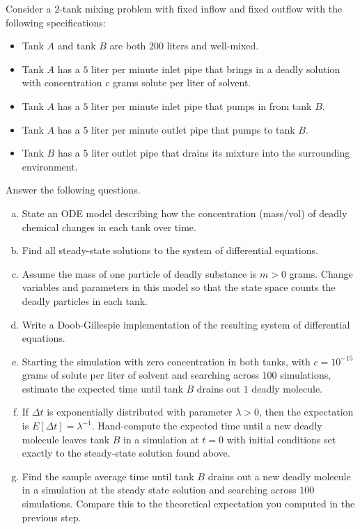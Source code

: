 \begin{exercises}

\item \label{ex:hw_two_tank}
Consider a $2$-tank mixing problem with fixed inflow and fixed outflow with the following specifications:
\begin{itemize}
\item Tank $A$ and tank $B$ are both $200$ liters and well-mixed.
\item Tank $A$ has a $5$ liter per minute inlet pipe that brings in a deadly solution with concentration $c$ grams solute per liter of solvent.
\item Tank $A$ has a $5$ liter per minute inlet pipe that pumps in from tank $B$.
\item Tank $A$ has a $5$ liter per minute outlet pipe that pumps to tank $B$.
\item Tank $B$ has a $5$ liter outlet pipe that drains its mixture into the surrounding environment.
\end{itemize}
Answer the following questions.
\begin{enumerate}[(a)]
\item State an ODE model describing how the concentration (mass/vol) of deadly chemical changes in each tank over time.
\item Find all steady-state solutions to the system of differential equations.
\item Assume the mass of one particle of deadly substance is $m > 0$ grams. Change variables and parameters in this model so that the state space counts the deadly particles in each tank.
\item Write a Doob-Gillespie implementation of the resulting system of differential equations.
\item Starting the simulation with zero concentration in both tanks, with $c = 10^{-15}$ grams of solute per liter of solvent and searching across $100$ simulations, estimate the expected time until tank $B$ drains out $1$ deadly molecule.
\item If $\Delta t$ is exponentially distributed with parameter $\lambda > 0$, then the expectation is $E[\Delta t] = \lambda^{-1}$. Hand-compute the expected time until a new deadly molecule leaves tank $B$ in a simulation at $t=0$ with initial conditions set exactly to the steady-state solution found above.

\item Find the sample average time until tank $B$ drains out a new deadly molecule in a simulation at the steady state solution and searching across $100$ simulations. Compare this to the theoretical expectation you computed in the previous step.


\end{enumerate}
\end{exercises}
